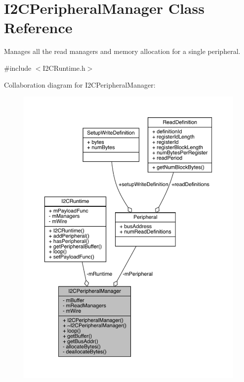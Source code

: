 \hypertarget{class_i2_c_peripheral_manager}{}\section{I2\+C\+Peripheral\+Manager Class Reference}
\label{class_i2_c_peripheral_manager}


Manages all the read managers and memory allocation for a single peripheral.  




{\ttfamily \#include $<$I2\+C\+Runtime.\+h$>$}



Collaboration diagram for I2\+C\+Peripheral\+Manager\+:\nopagebreak
\begin{figure}[H]
\begin{center}
\leavevmode
\includegraphics[width=350pt]{class_i2_c_peripheral_manager__coll__graph}
\end{center}
\end{figure}
